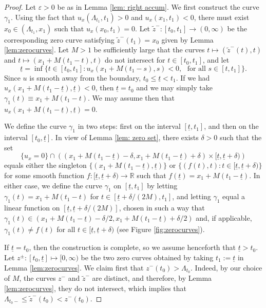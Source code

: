 \documentclass{article}
\numberwithin{equation}{section}
\numberwithin{figure}{section}
\theoremstyle{plain}
\theoremstyle{plain}
\theoremstyle{plain}
\theoremstyle{plain}
\theoremstyle{definition}
\theoremstyle{remark}
\def\vep{\varepsilon}
\def\R{{\mathbb{R}}}
\def\ut{{\underline{t}}}
\begin{document}
\begin{proof} Let $\vep>0$ be as in Lemma \ref{lem: right accum}. We first construct the curve $\gamma_1$. 
Using the fact that $u_x(\Lambda_{t_1},t_1)>0$ and $u_x(x_1,t_1)<0$, there must exist $x_0\in (\Lambda_{t_1},x_1)$ such that $u_x(x_0,t_1)=0$. Let $\tilde{z}^-:[t_0,t_1]\to (0,\infty)$ be the corresponding zero curve satisfying $\tilde{z}^-(t_1)=x_0$ given by Lemma \ref{lem:zerocurves}.  Let $M>1$ be sufficiently large that the curves $t\mapsto (\tilde{z}^-(t),t)$ and $t \mapsto (x_1+M(t_1-t),t)$ do not intersect for $t\in [t_0,t_1]$, and let
\begin{equation} \ut=\inf\{t\in [t_0,t_1]: u_x(x_1+M(t_1-s),s)<0,\,\, \text{ for all } s\in[t,t_1]\}. \end{equation}
Since $u$ is smooth away from the boundary, $t_0\leq \ut <t_1$. If we had $u_x(x_1+M(t_1-\underline{t}),\ut)<0$, then $\ut=t_0$ and we may simply take $\gamma_1(t)\equiv x_1+M(t_1-t)$. We may assume then that $u_x(x_1+M(t_1-\underline{t}),\ut)=0$. 

We define the curve $\gamma_1$ in two steps: first on the interval $[\ut,t_1]$, and then on the interval $[t_0,\ut]$. In view of Lemma \ref{lem: zero set}, there exists $\delta>0$ such that the set \[\{u_x=0\} \cap \left((x_1+M(t_1-\underline{t})-\delta,x_1+M(t_1-\underline{t})+\delta)\times [\ut,\ut+\delta)\right)\] equals either the singleton $\{(x_1+M(t_1-\underline{t}),\ut)\}$ or $\{(f(t),t):t\in [\ut,\ut+\delta)\}$ for some smooth function $f:[\ut,\ut+\delta)\to \R$ such that $f(\ut)=x_1+M(t_1-\underline{t})$. In either case, we define the curve $\gamma_1$ on $[\ut,t_1]$ by letting $\gamma_1(t)=x_1+M(t_1-t)$ for $t \in [\ut+\delta/(2M),t_1]$, and letting $\gamma_1$ equal a linear function on $ [\ut, \ut+\delta/(2M)]$, chosen in such a way that $\gamma_1(t)\in(x_1+M(t_1-\underline{t})-\delta/2,x_1+M(t_1-\underline{t})+\delta/2)$ and, if applicable, $\gamma_1(t)\neq f(t)$ for all $t\in [\ut,\ut+\delta)$ (see Figure \ref{fig:zerocurves}).


If $\ut=t_0$, then the construction is complete, so we assume henceforth that $\ut>t_0$. Let $z^{\pm}:[t_0,\ut]\mapsto [0,\infty)$ be the two zero curves obtained by taking  $t_1:=\ut$ in Lemma \ref{lem:zerocurves}. We claim first that $z^-(t_0)>\Lambda_{t_0}$. Indeed, by our choice of $M$, the curves $z^-$ and $\tilde{z}^-$ are distinct, and therefore, by Lemma \ref{lem:zerocurves}, they do not intersect, which implies that $\Lambda_{t_0-}\leq \tilde{z}^-(t_0)<z^-(t_0)$.


\end{proof}
\end{document}
